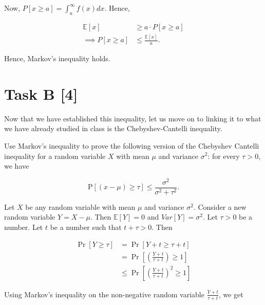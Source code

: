 Now, $P[x\ge a]=\int_{a}^{\infty}f(x)dx$. Hence,

\begin{equation*}
    \begin{aligned}
        \mathbb{E}[x] &\ge a\cdot P[x\ge a] \\
        \implies P[x\ge a] &\le \frac{\mathbb{E}[x]}{a}.
    \end{aligned}
\end{equation*}

Hence, Markov's inequality holds.

\section*{\colS{$\S$} Task B \hfill \normalfont \large [4]}

\begin{tcolorbox}
    Now that we have established this inequality, let us move on to linking it to
    what we have already studied in class is the Chebyshev-Cantelli inequality.

    Use Markov's inequality to prove the following version of the Chebyshev
    Cantelli inequality for a random variable $X$ with mean $\mu$ and variance
    $\sigma^2$: for every $\tau > 0$, we have

    \begin{equation*}
        \text{P}[(x - \mu) \ge \tau] \le \dfrac{\sigma^2}{\sigma^2 + \tau^2}.
    \end{equation*}
\end{tcolorbox}


Let $X$ be any random variable with mean $\mu$ and variance $\sigma^2$. Consider
a new random variable $Y = X-\mu$. Then $\mathbb{E}[Y]=0$ and $Var[Y]=\sigma^2$.
Let $\tau>0$ be a number. Let $t$ be a number such that $t+\tau>0$. Then

\begin{equation*}
    \begin{aligned}
        \Pr[Y \geq \tau] &= \Pr[Y + t \geq \tau + t] \\
        &= \Pr\left[\left(\frac{Y+t}{\tau+t}\right)\geq 1\right] \\
        &\le \Pr\left[\left(\frac{Y+t}{\tau+t}\right)^2\geq 1\right]
    \end{aligned}
\end{equation*}

Using Markov's inequality on the non-negative random variable
$\frac{Y+t}{\tau+t}$, we get


